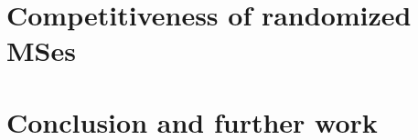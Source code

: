 \documentclass[11pt,letterpaper]{article}
\newcommand{\kctp}{$k$-CTP}
\newcommand{\mcals}{\mathcal{S}}
\newcommand{\mts}{MS}
\begin{document}
\section{Competitiveness of randomized \mts es} \label{sec:competitiveness}

\section{Conclusion and further work} \label{sec:conclusion}






\end{document}
